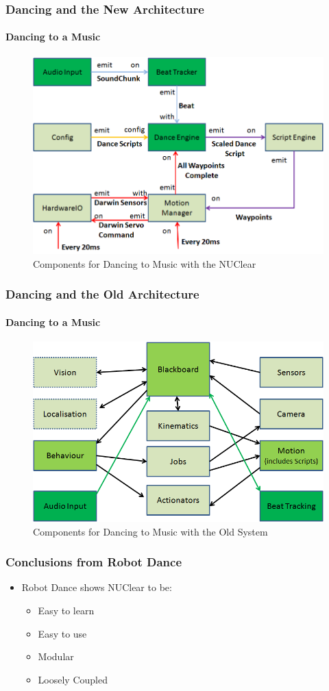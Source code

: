 \documentclass{beamer}
\begin{document}
	\begin{frame}
		\frametitle{Dancing and the New Architecture}
		\framesubtitle{Dancing to a Music}
		\begin{figure}
			\centering
			\includegraphics[scale=.45]{Presentation_Images/dance_audio_new_arc_change.png}
			\caption{Components for Dancing to Music with the NUClear}
		\end{figure}
	\end{frame}	
	\begin{frame}
		\frametitle{Dancing and the Old Architecture}
		\framesubtitle{Dancing to a Music}
		\begin{figure}
			\centering
			\includegraphics[scale=.45]{Presentation_Images/dance_audio_old_arc.png}
			\caption{Components for Dancing to Music with the Old System}
		\end{figure}
	\end{frame}	
	\begin{frame}
		\frametitle{Conclusions from Robot Dance}
			\begin{itemize}
				\item Robot Dance shows NUClear to be:
				\begin{itemize}
					\item Easy to learn
					\item Easy to use
					\item Modular
					\item Loosely Coupled
				\end{itemize}
			\end{itemize}
	\end{frame}	
\end{document}
